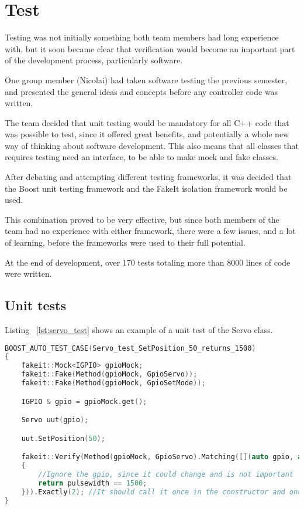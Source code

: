 \newpage
\chapter{Test}
\label{sec:test}
Testing was not initially something both team members had long experience with, but it soon became clear that verification would become an important part of the development process, particularly software. 

One group member (Nicolai) had taken software testing the previous semester, and presented the general ideas and concepts before any controller code was written. 

The team decided that unit testing would be mandatory for all C++ code that was possible to test, since it offered great benefits, and potentially a whole new way of thinking about software development. This also means that all classes that requires testing need an interface, to be able to make mock and fake classes.

After debating and attempting different testing frameworks, it was decided that the Boost unit testing framework and the FakeIt isolation framework would be used. 

This combination proved to be very effective, but since both members of the team had no experience with either framework, there were a few issues, and a lot of learning, before the frameworks were used to their full potential.

At the end of development, over 170 tests totaling more than 8000 lines of code were written. 

\section{Unit tests}

Listing ~\ref{lst:servo_test} shows an example of a unit test of the Servo class.

\begin{lstlisting}[caption = {Servo test of SetPosition}, captionpos=b, label={lst:servo_test}, language=C++,firstnumber=1]
BOOST_AUTO_TEST_CASE(Servo_test_SetPosition_50_returns_1500)
{
	fakeit::Mock<IGPIO> gpioMock;
	fakeit::Fake(Method(gpioMock, GpioServo));
	fakeit::Fake(Method(gpioMock, GpioSetMode));

	IGPIO & gpio = gpioMock.get();

	Servo uut(gpio);

	uut.SetPosition(50);

	fakeit::Verify(Method(gpioMock, GpioServo).Matching([](auto gpio, auto pulsewidth)
	{
		//Ignore the gpio, since it could change and is not important
		return pulsewidth == 1500;
	})).Exactly(2); //It should call it once in the constructor and once again when we set it.
}
\end{lstlisting}

